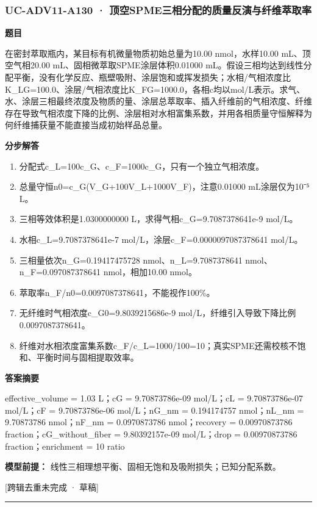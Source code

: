 \documentclass[UTF8,11pt,a4paper]{ctexart}
\begin{document}
\subsubsection*{UC-ADV11-A130 · 顶空SPME三相分配的质量反演与纤维萃取率}
\noindent\textbf{题目}\par
在密封萃取瓶内，某目标有机微量物质初始总量为10.00 nmol，水样10.00 mL、顶空气相20.00 mL、固相微萃取SPME涂层体积0.01000 mL。假设三相均达到线性分配平衡，没有化学反应、瓶壁吸附、涂层饱和或挥发损失；水相/气相浓度比K\_LG=100.0、涂层/气相浓度比K\_FG=1000.0，各相c均以mol/L表示。求气、水、涂层三相最终浓度及物质的量、涂层总萃取率、插入纤维前的气相浓度、纤维存在导致气相浓度下降的比例、涂层相对水相富集系数，并用各相质量守恒解释为何纤维捕获量不能直接当成初始样品总量。\par
\medskip\noindent\textbf{分步解答}
\begin{enumerate}
\item 分配式c\_L=100c\_G、c\_F=1000c\_G，只有一个独立气相浓度。
\item 总量守恒n0=c\_G(V\_G+100V\_L+1000V\_F)，注意0.01000 mL涂层仅为10⁻⁵ L。
\item 三相等效体积是1.0300000000 L，求得气相c\_G=9.7087378641e-9 mol/L。
\item 水相c\_L=9.7087378641e-7 mol/L，涂层c\_F=0.0000097087378641 mol/L。
\item 三相量依次n\_G=0.19417475728 nmol、n\_L=9.7087378641 nmol、n\_F=0.097087378641 nmol，相加10.00 nmol。
\item 萃取率n\_F/n0=0.0097087378641，不能视作100\%。
\item 无纤维时气相浓度c\_G0=9.8039215686e-9 mol/L，纤维引入导致下降比例0.0097087378641。
\item 纤维对水相浓度富集系数c\_F/c\_L=1000/100=10；真实SPME还需校核不饱和、平衡时间与固相提取效率。
\end{enumerate}
\noindent\textbf{答案摘要}\par
effective\_volume = 1.03 L；cG = 9.70873786e-09 mol/L；cL = 9.70873786e-07 mol/L；cF = 9.70873786e-06 mol/L；nG\_nm = 0.194174757 nmol；nL\_nm = 9.70873786 nmol；nF\_nm = 0.0970873786 nmol；recovery = 0.00970873786 fraction；cG\_without\_fiber = 9.80392157e-09 mol/L；drop = 0.00970873786 fraction；enrichment = 10 ratio\par
\noindent\textbf{模型前提：}
线性三相理想平衡、固相无饱和及吸附损失；已知分配系数。\par
\noindent\textcolor{red!65!black}{[跨辑去重未完成 · 草稿]} \par
\medskip\hrule\medskip
{}
\end{document}
